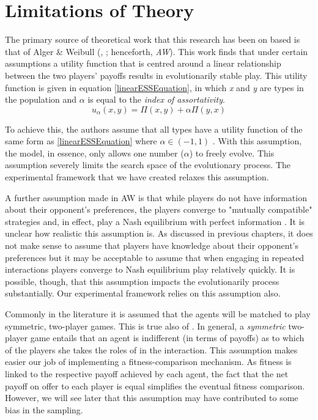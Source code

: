 \documentclass[11pt]{book}
\newcommand*{\np}{\par\noindent\newline}
\begin{document}
\section{Limitations of Theory}
\np The primary source of theoretical work that this research has been on based is that of Alger \& Weibull (\citeyear{alger_generalization_2012}, \citeyear{alger_homo_2013}; henceforth, \textit{AW}).
This work finds that under certain assumptions a utility function that is centred around a linear relationship between the two players' payoffs results in evolutionarily stable play.
This utility function is given in equation \ref{linearESSEquation}, in which \textit{x} and \textit{y} are types in the population and $\alpha$ is equal to the \textit{index of assortativity}.
\begin{equation}
	\label{linearESSEquation}
	u_\alpha(x, y) = \Pi(x,y) + \alpha\Pi(y,x)
\end{equation}

\noindent To achieve this, the authors assume that all types have a utility function of the same form as \ref{linearESSEquation} where $\alpha \in (-1, 1)$ \citep[p. ~47]{alger_generalization_2012}.
With this assumption, the model, in essence, only allows one number ($\alpha$) to freely evolve.
This assumption severely limits the search space of the evolutionary process. 
The experimental framework that we have created relaxes this assumption.

\np A further assumption made in AW is that while players do not have information about their opponent's preferences,
the players converge to "mutually compatible" strategies and, in effect, play a Nash equilibrium with perfect information \citep[p. ~46]{alger_generalization_2012}.
It is unclear how realistic this assumption is. 
As discussed in previous chapters, it does not make sense to assume that players have knowledge about their opponent's preferences 
but it may be acceptable to assume that when engaging in repeated interactions players converge to Nash equilibrium play relatively quickly.
It is possible, though, that this assumption impacts the evolutionarily process substantially. 
Our experimental framework relies on this assumption also.

\np Commonly in the literature it is assumed that the agents will be matched to play symmetric, two-player games.
This is true also of \citet{alger_generalization_2012}.
In general, a \textit{symmetric} two-player game entails that an agent is indifferent (in terms of payoffs) as to which of the players she takes the roles of in the interaction.
This assumption makes easier our job of implementing a fitness-comparison mechanism.
As fitness is linked to the respective payoff achieved by each agent, the fact that the net payoff on offer to each player is equal simplifies the eventual fitness comparison.
However, we will see later that this assumption may have contributed to some bias in the sampling.
\end{document}
